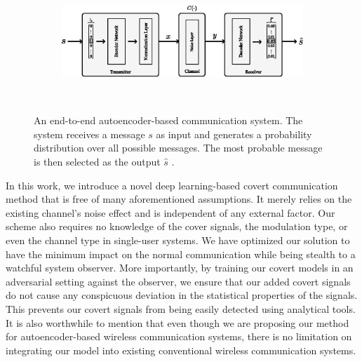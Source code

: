 \begin{figure}[tp!]
	\center
	\begin{subfigure}{0.45\textwidth}
		\includegraphics[width=\linewidth]{figs/original_autoencoder_architecture.eps}
	\end{subfigure}
	\\
	\caption{An end-to-end autoencoder-based communication system. The system receives a message \(s\) as input and generates a probability distribution over all possible messages. The most probable message is then selected as the output \(\hat{s}\) \cite{o2017introduction}.}	
	\label{fig:original_autoencoder_architecture}
\end{figure}

In this work, we introduce a novel deep learning-based covert communication method that is free of many aforementioned assumptions. It merely relies on the existing channel's noise effect and is independent of any external factor. Our scheme also requires no knowledge of the cover signals, the modulation type, or even the channel type in single-user systems. We have optimized our solution to have the minimum impact on the normal communication while being stealth to a watchful system observer. More importantly, by training our covert models in an adversarial setting against the observer, we ensure that our added covert signals do not cause any conspicuous deviation in the statistical properties of the signals. This prevents our covert signals from being easily detected using analytical tools. It is also worthwhile to mention that even though we are proposing our method for autoencoder-based wireless communication systems, there is no limitation on integrating our model into existing conventional wireless communication systems.

